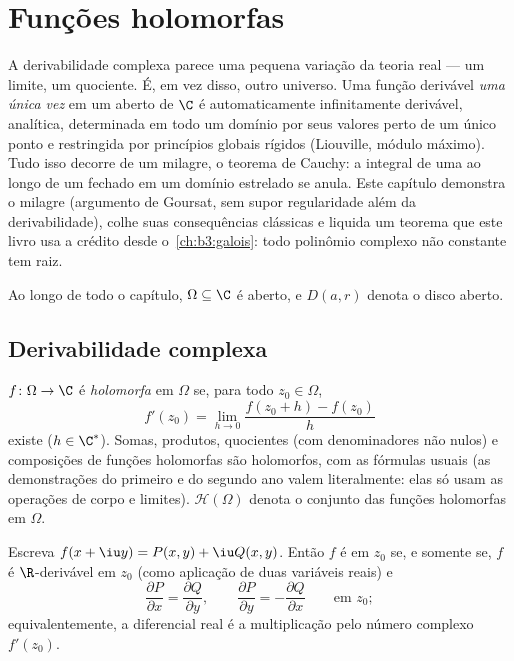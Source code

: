 \chapter{Funções holomorfas}\label{ch:b3:holomorphic}

A derivabilidade complexa parece uma pequena variação da teoria real
--- um limite, um quociente. É, em vez disso, outro universo. Uma
função derivável \emph{uma única vez} em um aberto de $\C$ é
automaticamente infinitamente derivável, analítica, determinada em todo
um domínio por seus valores perto de um único ponto e restringida por
princípios globais rígidos (Liouville, módulo máximo). Tudo isso decorre
de um milagre, o teorema de Cauchy: a integral de uma 
ao longo de um  fechado em um domínio estrelado se anula. Este
capítulo demonstra o milagre (argumento de Goursat, sem supor
regularidade além da derivabilidade), colhe suas consequências
clássicas e liquida um teorema que este livro usa a crédito desde o~\cref{ch:b3:galois}: todo polinômio complexo não constante tem raiz.

Ao longo de todo o capítulo, $\Omega \subseteq \C$ é aberto, e $D(a, r)$ denota o disco aberto.

\section{Derivabilidade complexa}

\begin{definition}\label{def:b3:holomorphic:holo}
$f \colon \Omega \to \C$ é \emph{holomorfa} em $\Omega$ se, para
todo $z_0 \in \Omega$,
\[
f'(z_0) = \lim_{h\to0}\frac{f(z_0 + h) - f(z_0)}{h}
\]
existe ($h \in \C^*$). Somas, produtos, quocientes (com denominadores não
nulos) e composições de funções holomorfas são holomorfos, com as
fórmulas usuais (as demonstrações do primeiro e do segundo ano valem
literalmente: elas só usam as operações de corpo e limites). $\mathcal H(\Omega)$ denota
o conjunto das funções holomorfas em $\Omega$.
\end{definition}

\begin{proposition}
\label{prop:b3:holomorphic:cauchyriemann}
Escreva $f(x + \iu y) = P(x,y) + \iu Q(x,y)$. Então $f$ é  em $z_0$ se, e somente se,
$f$ é $\R$-derivável em $z_0$ (como aplicação de duas variáveis
reais) e
\[
\frac{\partial P}{\partial x} = \frac{\partial Q}{\partial y},
\qquad
\frac{\partial P}{\partial y} = -\frac{\partial Q}{\partial x}
\qquad \text{em } z_0 ;
\]
equivalentemente, a diferencial real é a multiplicação pelo número
complexo $f'(z_0)$.
\end{proposition}

